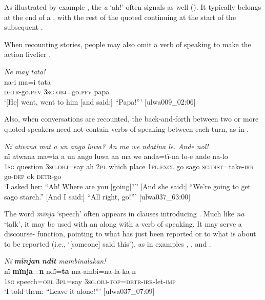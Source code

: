 As illustrated by example , the  \textit{a} ‘ah!’ often signals  as well (). It typically belongs at the end of a , with the rest of the quoted  continuing at the start of the subsequent .

  When recounting stories, people may also omit a verb of speaking to make the action livelier .

\ea%
    \label{ex:syntax:223}
          \textit{Ne may tata!}\\
\gll    na-i      ma=i        tata\\
    \textsc{detr-}go.\textsc{pfv}  \textsc{3sg.obj}=go.\textsc{pfv}  papa\\
\glt `[He] went, went to him [and said:] “Papa!”’ [ulwa009\_02:06]
\z

Also, when conversations are recounted, the back-and-forth between two or more quoted speakers need not contain verbs of speaking between each turn, as in .

\ea%
    \label{ex:syntax:224}
          \textit{Nï atwana mat a un ango luwa? An ma we ndatïna le. Ande nol!}\\
\gll    nï    atwana    ma=ta      a  un  ango  luwa  an ma  we    anda=tï-na      lo-e  ande  na-lo\\
    1\textsc{sg}  question  3\textsc{sg.obj}=say  ah  2\textsc{pl}  which  place  1\textsc{pl.excl}    go  sago  \textsc{sg.dist}=take-\textsc{irr}  go-\textsc{dep}  ok    \textsc{detr-}go\\
\glt `I asked her: “Ah! Where are you [going]?” [And she said:] “We’re going to get sago starch.” [And I said:] “All right, go!”’ [ulwa037\_63:00]
\z

The word \textit{mïnja} ‘speech’ often appears in clauses introducing . Much like \textit{na} ‘talk’, it may be used with an  along with a verb of speaking. It may serve a discourse- function, pointing to what has just been reported or to what is about to be reported (i.e., ‘[someone] said this’), as in examples , , and .

\ea%
    \label{ex:syntax:225}
          \textit{Nï} \textbf{\textit{mïnjan}} \textbf{\textit{ndït}} \textit{mambinalakan!}\\
\gll    nï    \textbf{mïnja=n}    ndï=\textbf{ta}    ma-ambi=na-la-ka-n\\
    1\textsc{sg}  speech=\textsc{obl}  3\textsc{pl}=say  3\textsc{sg.obj-top}\textsc{=detr-irr-}let-\textsc{imp}\\
\glt `I told them: “Leave it alone!”’ [ulwa037\_07:09]
\z

